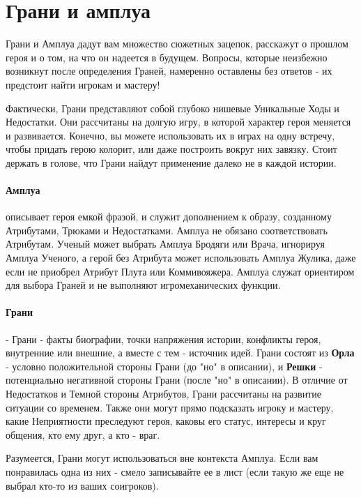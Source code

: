 \section{Грани и амплуа}
Грани и Амплуа дадут вам множество сюжетных зацепок, расскажут о прошлом героя и о том, на что он надеется в будущем. Вопросы, которые неизбежно возникнут после определения Граней, намеренно оставлены без ответов - их предстоит найти игрокам и мастеру!
\begin{tcolorbox}
    Фактически, Грани представляют собой глубоко нишевые Уникальные Ходы и Недостатки. Они рассчитаны на долгую игру, в которой характер героя меняется и развивается. Конечно, вы можете использовать их в играх на одну встречу, чтобы придать герою колорит, или даже построить вокруг них завязку. Стоит держать в голове, что Грани найдут применение далеко не в каждой истории. 
\end{tcolorbox}
\paragraph{Амплуа} описывает героя емкой фразой, и служит дополнением к образу, созданному Атрибутами, Трюками и Недостатками. Амплуа не обязано соответствовать Атрибутам. Ученый может выбрать Амплуа Бродяги или Врача, игнорируя Амплуа Ученого, а герой без Атрибута может использовать Амплуа Жулика, даже если не приобрел Атрибут Плута или Коммивояжера. Амплуа служат ориентиром для выбора Граней и не выполняют игромеханических функции.
\paragraph{Грани} - Грани - факты биографии, точки напряжения истории, конфликты героя, внутренние или внешние, а вместе с тем - источник идей. Грани состоят из \textbf{Орла} - условно положительной стороны Грани (до "но" в описании), и \textbf{Решки} - потенциально негативной стороны Грани (после "но" в описании). 
\newline В отличие от Недостатков и Темной стороны Атрибутов, Грани рассчитаны на развитие ситуации со временем. Также они могут прямо подсказать игроку и мастеру, какие Неприятности преследуют героя, каковы его статус, интересы и круг общения, кто ему друг, а кто - враг.
\begin{tcolorbox}
    Разумеется, Грани могут использоваться вне контекста Амплуа. Если вам понравилась одна из них - смело записывайте ее в лист (если такую же еще не выбрал кто-то из ваших соигроков).
\end{tcolorbox}
